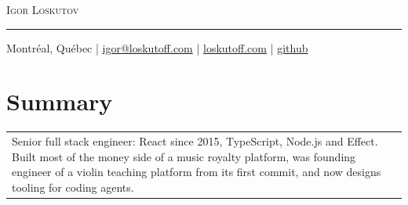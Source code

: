 \documentclass[letterpaper,10pt]{article}
\begin{document}
\par{\centering
		{\Huge \textsc{Igor Loskutov}\par}
		\smallskip\par}

\hrule
\vspace{0.5em}
{\centering Montr\'eal, Qu\'ebec
  | \faEnvelope{} \href{mailto:igor@loskutoff.com}{igor@loskutoff.com}
  | \faHome{} \href{https://loskutoff.com}{loskutoff.com}
  | \faGithub{} \href{https://github.com/dearlordylord}{github}\par}

\section{Summary}
\begin{tabular}{p{}}
 Senior full stack engineer: React since 2015, TypeScript, Node.js and Effect. Built most of the money side of a music royalty platform, was founding engineer of a violin teaching platform from its first commit, and now designs tooling for coding agents.
\end{tabular}
\end{document}
